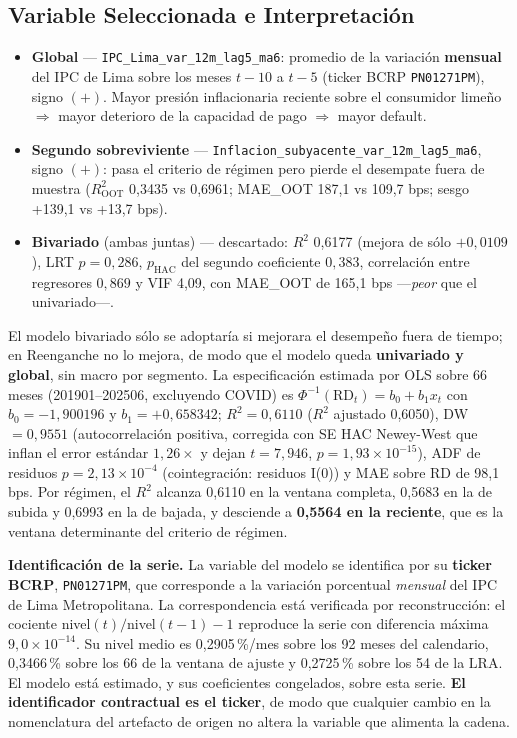 \documentclass[12pt, a4paper]{article}
\newcommand{\RD}{\ensuremath{\mathrm{RD}}}
\newcommand{\LRA}{\ensuremath{\mathrm{LRA}}}
\newcommand{\Norm}{\ensuremath{\Phi}}
\begin{document}
\subsection{Variable Seleccionada e Interpretación}
\begin{itemize}[nosep]
  \item \textbf{Global} --- \texttt{IPC\_Lima\_var\_12m\_lag5\_ma6}: promedio de la variación
    \textbf{mensual} del IPC de Lima sobre los meses $t-10$ a $t-5$ (ticker BCRP
    \texttt{PN01271PM}), signo $(+)$. Mayor presión inflacionaria reciente sobre el consumidor
    limeño $\Rightarrow$ mayor deterioro de la capacidad de pago $\Rightarrow$ mayor default.
  \item \textbf{Segundo sobreviviente} --- \texttt{Inflacion\_subyacente\_var\_12m\_lag5\_ma6},
    signo $(+)$: pasa el criterio de régimen pero pierde el desempate fuera de muestra
    ($R^2_{\text{OOT}}$ 0,3435 vs 0,6961; MAE\_OOT 187,1 vs 109,7 bps; sesgo +139,1 vs +13,7 bps).
  \item \textbf{Bivariado} (ambas juntas) --- descartado: $R^2$ 0,6177 (mejora de sólo $+0{,}0109$),
    LRT $p=0{,}286$, $p_{\text{HAC}}$ del segundo coeficiente $0{,}383$, correlación entre
    regresores $0{,}869$ y VIF 4,09, con MAE\_OOT de 165,1 bps ---\emph{peor} que el univariado---.
\end{itemize}
El modelo bivariado sólo se adoptaría si mejorara el desempeño fuera de tiempo; en Reenganche no lo
mejora, de modo que el modelo queda \textbf{univariado y global}, sin macro por segmento. La especificación estimada por
OLS sobre 66 meses (201901--202506, excluyendo COVID) es
$\Norm^{-1}(\RD_t)=b_0+b_1x_t$ con $b_0=-1{,}900196$ y $b_1=+0{,}658342$; $R^2=0{,}6110$
($R^2$ ajustado 0,6050), DW $=0{,}9551$ (autocorrelación positiva, corregida con SE HAC
Newey-West que inflan el error estándar $1{,}26\times$ y dejan $t=7{,}946$,
$p=1{,}93\times10^{-15}$), ADF de residuos $p=2{,}13\times10^{-4}$ (cointegración: residuos I(0))
y MAE sobre RD de 98,1 bps. Por régimen, el $R^2$ alcanza 0,6110 en la ventana completa, 0,5683 en
la de subida y 0,6993 en la de bajada, y desciende a \textbf{0,5564 en la reciente}, que es la
ventana determinante del criterio de régimen.

\medskip
\noindent\textbf{Identificación de la serie.} La variable del modelo se identifica por su \textbf{ticker BCRP}, \texttt{PN01271PM}, que corresponde a la variación porcentual \emph{mensual} del IPC de Lima Metropolitana. La correspondencia está verificada por reconstrucción: el cociente nivel$(t)/$nivel$(t-1)-1$ reproduce la serie con diferencia máxima $9{,}0\times10^{-14}$. Su nivel medio es 0,2905\,\%/mes sobre los 92 meses del calendario, 0,3466\,\% sobre los 66 de la ventana de ajuste y 0,2725\,\% sobre los 54 de la \LRA{}. El modelo está estimado, y sus coeficientes congelados, sobre esta serie. \textbf{El identificador contractual es el ticker}, de modo que cualquier cambio en la nomenclatura del artefacto de origen no altera la variable que alimenta la cadena.
\end{document}

